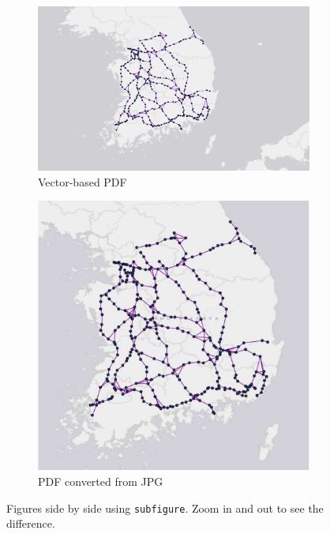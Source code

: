 \documentclass[letterpaper, 11pt]{article}
\begin{document}
\begin{figure} \centering
\begin{subfigure}[b]{0.4\textwidth}
\includegraphics[width=\textwidth]{map}
\caption{Vector-based PDF}
\label{fig:map-pdf}
\end{subfigure}
%
\begin{subfigure}[b]{0.4\textwidth}
\includegraphics[width=\textwidth]{map-jpg}
\caption{PDF converted from JPG}
\label{fig:map-jpg}
\end{subfigure}
\caption{Figures side by side using \texttt{subfigure}. Zoom in and out to see the difference.}
\label{fig:side-by-side}
\end{figure}
\end{document}
